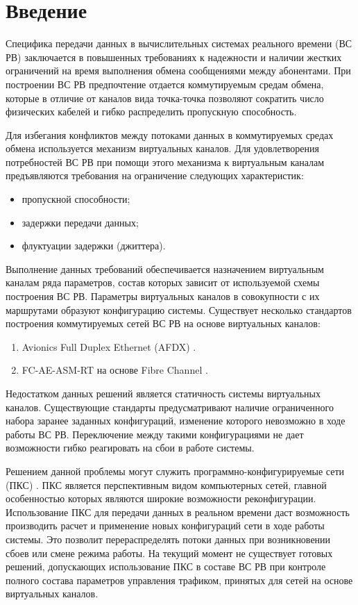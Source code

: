 \documentclass[12pt, a4paper]{article}
\begin{document}
\renewcommand{\contentsname}{Содержание}
\tableofcontents

\section*{Введение}
Специфика передачи данных в вычислительных системах реального времени (ВС РВ) заключается в повышенных требованиях к надежности и наличии жестких ограничений на время выполнения обмена сообщениями между абонентами. При построении ВС РВ предпочтение отдается коммутируемым средам обмена, которые в отличие от каналов вида точка-точка позволяют сократить число физических кабелей и гибко распределить пропускную способность.

Для избегания конфликтов между потоками данных в коммутируемых средах обмена используется механизм виртуальных каналов. Для удовлетворения потребностей ВС РВ при помощи этого механизма к виртуальным каналам предъявляются требования на ограничение следующих характеристик:
\begin{itemize}
	\item пропускной способности;
	\item задержки передачи данных;
	\item флуктуации задержки (джиттера).
\end{itemize}

Выполнение данных требований обеспечивается назначением виртуальным каналам ряда параметров, состав которых зависит от используемой схемы построения ВС РВ. Параметры виртуальных каналов в совокупности с их маршрутами образуют конфигурацию системы. Существует несколько стандартов построения коммутируемых сетей ВС РВ на основе виртуальных каналов:
\begin{enumerate}
	\item Avionics Full Duplex Ethernet (AFDX) \cite{afdx}.
	\item FC-AE-ASM-RT на основе Fibre Channel \cite{fcaert}.
\end{enumerate}

Недостатком данных решений является статичность системы виртуальных каналов. Существующие стандарты предусматривают наличие ограниченного набора заранее заданных конфигураций, изменение которого невозможно в ходе работы ВС РВ. Переключение между такими конфигурациями не дает возможности гибко реагировать на сбои в работе системы.

Решением данной проблемы могут служить программно-конфигурируемые сети (ПКС) \cite{sdn}. ПКС является перспективным видом компьютерных сетей, главной особенностью которых являются широкие возможности реконфигурации. Использование ПКС для передачи данных в реальном времени даст возможность производить расчет и применение новых конфигураций сети в ходе работы системы. Это позволит перераспределять потоки данных при возникновении сбоев или смене режима работы. На текущий момент не существует готовых решений, допускающих использование ПКС в составе ВС РВ при контроле полного состава параметров управления трафиком, принятых для сетей на основе виртуальных каналов.
\end{document}
